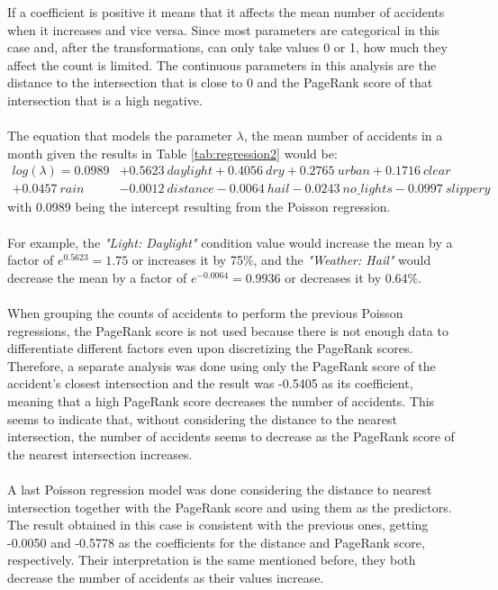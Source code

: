 If a coefficient is positive it means that it affects the mean number of accidents when it increases and vice versa. Since most parameters are categorical in this case and, after the transformations, can only take values 0 or 1, how much they affect the count is limited. The continuous parameters in this analysis are the distance to the intersection that is close to 0 and the PageRank score of that intersection that is a high negative.
\\
\\
The equation that models the parameter $\lambda$, the mean number of accidents in a month given the results in Table \ref{tab:regression2} would be:
\begin{align}
    log(\lambda) = 0.0989 &+ 0.5623\:daylight + 0.4056\:dry + 0.2765\:urban + 0.1716\:clear \\ + 0.0457\:rain & - 0.0012\:distance - 0.0064\:hail - 0.0243\:no\_lights - 0.0997\:slippery \nonumber
\end{align}
with 0.0989 being the intercept resulting from the Poisson regression. 
\\
\\
For example, the \textit{"Light: Daylight"} condition value would increase the mean by a factor of $e^{0.5623}=1.75$ or increases it by 75\%, and the \textit{"Weather: Hail"} would decrease the mean by a factor of $e^{-0.0064}=0.9936$ or decreases it by 0.64\%.
\\
\\
When grouping the counts of accidents to perform the previous  Poisson regressions, the PageRank score is not used because there is not enough data to differentiate different factors even upon discretizing the PageRank scores. Therefore, a separate analysis was done using only the PageRank score of the accident's closest intersection and the result was -0.5405 as its coefficient, meaning that a high PageRank score decreases the number of accidents. This seems to indicate that, without considering the distance to the nearest intersection, the number of accidents seems to decrease as the PageRank score of the nearest intersection increases.
\\
\\
A last Poisson regression model was done considering the distance to nearest intersection together with the PageRank score and using them as the predictors. The result obtained in this case is consistent with the previous ones, getting -0.0050 and -0.5778 as the coefficients for the distance and PageRank score, respectively. Their interpretation is the same mentioned before, they both decrease the number of accidents as their values increase. 

